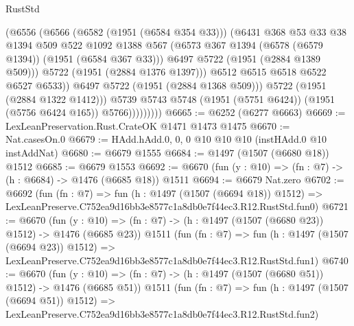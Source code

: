 \begin{lexlean}{RustStd}
\begin{coremodule}
                            (@6556
                              (@6566
                                (@6582 (@1951 (@6584 @354 @33)))
                                (@6431
                                  @368
                                  @53
                                  @33
                                  @38
                                  @1394
                                  @509
                                  @522
                                  @1092
                                  @1388
                                  @567
                                  (@6573 @367 @1394 (@6578 (@6579 @1394)) (@1951 (@6584 @367 @33)))
                                  @6497
                                  @5722
                                  (@1951 (@2884 @1389 @509)))
                                @5722
                                (@1951 (@2884 @1376 @1397)))
                              @6512
                              @6515
                              @6518
                              @6522
                              @6527
                              @6533))
                          @6497
                          @5722
                          (@1951 (@2884 @1368 @509)))
                        @5722
                        (@1951 (@2884 @1322 @1412)))
                      @5739
                      @5743
                      @5748
                      (@1951 (@5751 @6424))
                      (@1951 (@5756 @6424 @165))
                      @5766)))))))))
@6665 := @6252 (@6277 @6663)
@6669 := LexLeanPreservation.Rust.CrateOK @1471 @1473 @1475
@6670 := Nat.casesOn.{0}
@6679 := HAdd.hAdd.{0, 0, 0} @10 @10 @10 (instHAdd.{0} @10 instAddNat)
@6680 := @6679 @1555
@6684 := @1497 (@1507 (@6680 @18)) @1512
@6685 := @6679 @1553
@6692 := @6670 (fun (y : @10) => (fn : @7) -> (h : @6684) -> @1476 (@6685 @18)) @1511
@6694 := @6679 Nat.zero
@6702 := @6692
    (fun (fn : @7) =>
    fun (h : @1497 (@1507 (@6694 @18)) @1512) =>
    LexLeanPreserve.C752ea9d16bb3e8577c1a8db0e7f44ec3.R12.RustStd.fun0)
@6721 := @6670
    (fun (y : @10) => (fn : @7) -> (h : @1497 (@1507 (@6680 @23)) @1512) -> @1476 (@6685 @23))
    @1511
    (fun (fn : @7) =>
    fun (h : @1497 (@1507 (@6694 @23)) @1512) =>
    LexLeanPreserve.C752ea9d16bb3e8577c1a8db0e7f44ec3.R12.RustStd.fun1)
@6740 := @6670
    (fun (y : @10) => (fn : @7) -> (h : @1497 (@1507 (@6680 @51)) @1512) -> @1476 (@6685 @51))
    @1511
    (fun (fn : @7) =>
    fun (h : @1497 (@1507 (@6694 @51)) @1512) =>
    LexLeanPreserve.C752ea9d16bb3e8577c1a8db0e7f44ec3.R12.RustStd.fun2)

\end{coremodule}
\end{lexlean}
